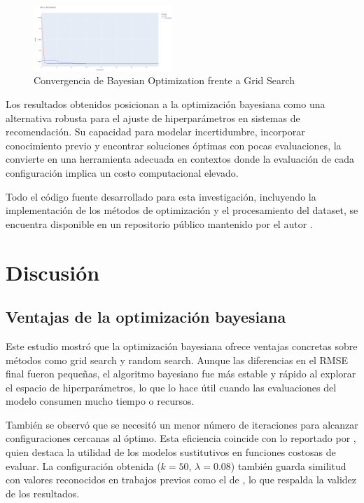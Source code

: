 \documentclass[twocolumn,10pt]{article}
\begin{document}
\begin{figure}[H]
\centering
\includegraphics[width=0.47\textwidth]{fig_bo_vs_grid.png}
\caption{Convergencia de Bayesian Optimization frente a Grid Search}
\label{fig:bo_vs_grid}
\end{figure}

Los resultados obtenidos posicionan a la optimización bayesiana como una alternativa robusta para el ajuste de hiperparámetros en sistemas de recomendación. Su capacidad para modelar incertidumbre, incorporar conocimiento previo y encontrar soluciones óptimas con pocas evaluaciones, la convierte en una herramienta adecuada en contextos donde la evaluación de cada configuración implica un costo computacional elevado.

Todo el código fuente desarrollado para esta investigación, incluyendo la implementación de los métodos de optimización y el procesamiento del dataset, se encuentra disponible en un repositorio público mantenido por el autor \citep{kenny2025github}.

\section{Discusión}

\subsection{Ventajas de la optimización bayesiana}

Este estudio mostró que la optimización bayesiana ofrece ventajas concretas sobre métodos como grid search y random search. Aunque las diferencias en el RMSE final fueron pequeñas, el algoritmo bayesiano fue más estable y rápido al explorar el espacio de hiperparámetros, lo que lo hace útil cuando las evaluaciones del modelo consumen mucho tiempo o recursos.

También se observó que se necesitó un menor número de iteraciones para alcanzar configuraciones cercanas al óptimo. Esta eficiencia coincide con lo reportado por \citet{frazier2018tutorial}, quien destaca la utilidad de los modelos sustitutivos en funciones costosas de evaluar. La configuración obtenida ($k = 50$, $\lambda = 0.08$) también guarda similitud con valores reconocidos en trabajos previos como el de \citet{koren2009matrix}, lo que respalda la validez de los resultados.
\end{document}
